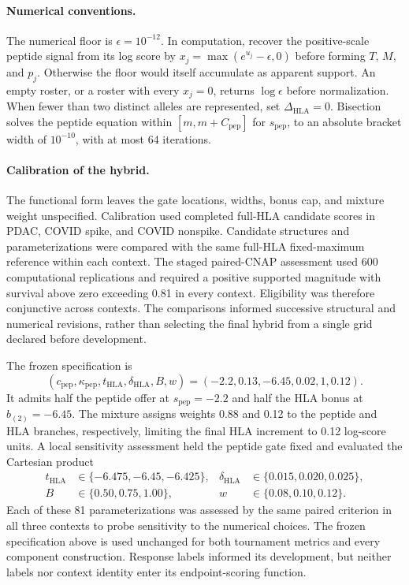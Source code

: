 \documentclass[11pt]{article}
\begin{document}
\paragraph{Numerical conventions.}
The numerical floor is \(\epsilon=10^{-12}\). In computation, recover the
positive-scale peptide signal from its log score by
\(x_j=\max(e^{u_j}-\epsilon,0)\) before forming \(T\), \(M\), and
\(p_j\). Otherwise the floor would itself accumulate as apparent support.
An empty roster, or a roster with every \(x_j=0\), returns
\(\log\epsilon\) before normalization. When fewer than two distinct
alleles are represented, set \(\Delta_{\mathrm{HLA}}=0\).
Bisection solves the peptide equation within
\([m,m+C_{\mathrm{pep}}]\) for \(s_{\mathrm{pep}}\), to an absolute
bracket width of \(10^{-10}\), with at most 64 iterations.

\paragraph{Calibration of the hybrid.}
The functional form leaves the gate locations, widths, bonus cap, and mixture
weight unspecified. Calibration used completed full-HLA candidate scores in PDAC, COVID spike, and
COVID nonspike. Candidate structures and parameterizations were compared with
the same full-HLA fixed-maximum reference within each context. The staged
paired-CNAP assessment used 600 computational replications and required a
positive supported magnitude with survival above zero exceeding 0.81 in every
context. Eligibility was therefore conjunctive across contexts. The comparisons
informed successive structural and numerical revisions, rather than selecting
the final hybrid from a single grid declared before development.

The frozen specification is
\[
(c_{\mathrm{pep}},\kappa_{\mathrm{pep}},t_{\mathrm{HLA}},
\delta_{\mathrm{HLA}},B,w)
=(-2.2,0.13,-6.45,0.02,1,0.12).
\]
It admits half the peptide offer at \(s_{\mathrm{pep}}=-2.2\) and half
the HLA bonus at \(b_{(2)}=-6.45\). The mixture assigns weights 0.88 and
0.12 to the peptide and HLA branches, respectively, limiting the final HLA
increment to 0.12 log-score units.
A local sensitivity assessment held the peptide gate fixed and evaluated the
Cartesian product
\begin{align*}
t_{\mathrm{HLA}}&\in\{-6.475,-6.45,-6.425\},
&\delta_{\mathrm{HLA}}&\in\{0.015,0.020,0.025\},\\
B&\in\{0.50,0.75,1.00\},
&w&\in\{0.08,0.10,0.12\}.
\end{align*}
Each of these 81 parameterizations was assessed by the same paired criterion
in all three contexts to probe sensitivity to the numerical choices.
The frozen specification above is used unchanged for
both tournament metrics and every component construction. Response labels
informed its development, but neither labels nor context identity enter its
endpoint-scoring function.
\end{document}
